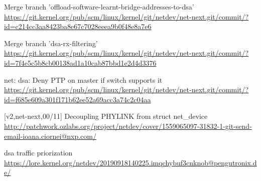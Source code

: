 \documentclass[letterpaper]{article}
\begin{document}
\begin{minipage}{\textwidth}
\begin{thebibliography}{2}
Merge branch 'offload-software-learnt-bridge-addresses-to-dsa'\\
\url{https://git.kernel.org/pub/scm/linux/kernel/git/netdev/net-next.git/commit/?id=c214cc3aa8423ba8e67c7028eeea9b0f48e8a7e6}

Merge branch 'dsa-rx-filtering'\\
\url{https://git.kernel.org/pub/scm/linux/kernel/git/netdev/net-next.git/commit/?id=7f4e5c5b8cb00138ad1a10cab87bbd1e2d4d3376}

net: dsa: Deny PTP on master if switch supports it\\
\url{https://git.kernel.org/pub/scm/linux/kernel/git/netdev/net-next.git/commit/?id=f685e609a301f171b62ee52a69acc3a74c2c04aa}

[v2,net-next,00/11] Decoupling PHYLINK from struct net\_device\\
\url{http://patchwork.ozlabs.org/project/netdev/cover/1559065097-31832-1-git-send-email-ioana.ciornei@nxp.com/}

dsa traffic priorization\\
\url{https://lore.kernel.org/netdev/20190918140225.imqchybuf3cnknob@pengutronix.de/}

\end{thebibliography}
\end{minipage}
\end{document}
